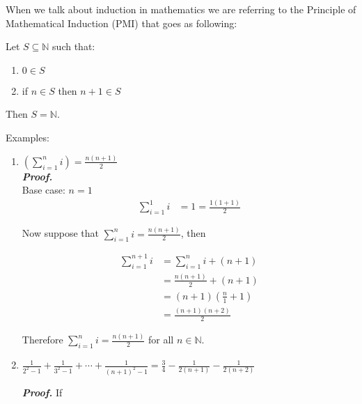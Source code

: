 \documentclass{report}
\begin{document}
    When we talk about induction in mathematics we are referring to the Principle of Mathematical Induction (PMI) that goes as following:

    Let $S \subseteq \mathbb{N}$ such that:

    \begin{enumerate}
        \item $0 \in S$
        \item if $n \in S$ then $n+1 \in S$
    \end{enumerate}

    Then $S = \mathbb{N}$.

    Examples:

    \begin{enumerate}
        \item $(\sum_{i=1}^{n} i) = \frac{n(n+1)}{2}$\\
        \textit{\textbf{Proof.}}\\
        Base case: $n=1$
        \begin{align*}
            \sum_{i=1}^{1} i &= 1 = \frac{1(1+1)}{2}
        \end{align*}

        Now suppose that $\sum_{i=1}^{n} i = \frac{n(n+1)}{2}$, then

        \begin{align*}
            \sum_{i=1}^{n+1} i &= \sum_{i=1}^{n} i + (n+1)\\
            &= \frac{n(n+1)}{2} + (n+1)\\
            &= (n+1)(\frac{n}{1} + 1)\\
            &= \frac{(n+1)(n+2)}{2}
        \end{align*}

        Therefore $\sum_{i=1}^{n} i = \frac{n(n+1)}{2}$ for all $n \in \mathbb{N}$.

        \item $\frac{1}{2^2-1}+\frac{1}{3^2-1}+\cdots + \frac{1}{(n+1)^2-1}= \frac{3}{4} - \frac{1}{2(n+1)}-\frac{1}{2(n+2)}$

        \textit{\textbf{Proof.}} If
    \end{enumerate}
\end{document}
